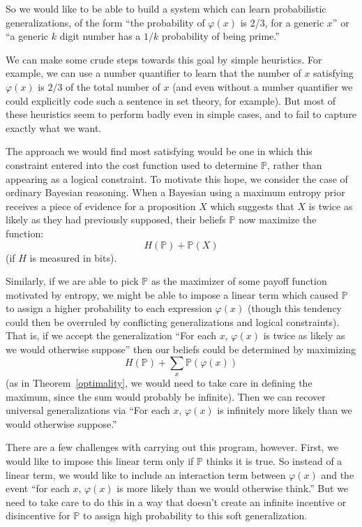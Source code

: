\documentclass[12pt]{article}
\theoremstyle{definition}
\newcommand{\of}[1]{\left(#1\right)}
\newcommand{\PP}{\mathbb{P}}
\renewcommand{\P}[1]{\mathbb{P}\of{#1}}
\newcommand{\vp}{\varphi}
\begin{document}
So we would like to be able to build a system which can learn
probabilistic generalizations, of the form ``the probability of $\vp\of{x}$
is 2/3, for a generic $x$'' or ``a generic $k$ digit number has a $1/k$ probability of being prime.''

We can make some crude steps towards this goal by simple heuristics.
For example, we can use a number quantifier to learn that the number of $x$
satisfying $\vp\of{x}$ is $2/3$ of the total number of $x$
(and even without a number quantifier we could explicitly code such a sentence in set theory, for example).
But most of these heuristics seem to perform badly even in simple cases,
and to fail to capture exactly what we want.


The approach we would find most satisfying would be one in which this constraint entered into the cost function
used to determine $\PP$, rather than appearing as a logical constraint.
To motivate this hope, we consider the case of ordinary Bayesian reasoning.
When a Bayesian using a maximum entropy prior receives a piece of evidence for a proposition $X$
which suggests that $X$ is twice as likely as they had previously supposed,
their beliefs $\PP$ now maximize the function:
\[ H\of{\PP} + \PP\of{X} \]
(if $H$ is measured in bits).

Similarly, if we are able to pick $\PP$ as the maximizer of some payoff function
motivated by entropy, we might be able to impose a linear term
which caused $\PP$ to assign a higher probability to each expression $\vp\of{x}$
(though this tendency could then be overruled by conflicting generalizations
and logical constraints).
That is, if we accept the generalization ``For each $x$, $\vp\of{x}$ is twice
as likely as we would otherwise suppose''
then our beliefs could be determined by maximizing
\[ H\of{\PP} + \sum_{x} \P{\vp\of{x}} \]
(as in Theorem~\ref{optimality}, we would need to take care
in defining the maximum, since the sum would probably be infinite).
Then we can recover universal generalizations via ``For each $x$, $\vp\of{x}$
is infinitely more likely than we would otherwise suppose.'' %

There are a few challenges with carrying out this program, however.
First, we would like to impose this linear term only if $\PP$
thinks it is true.
So instead of a linear term, we would like to include an interaction term
between $\vp\of{x}$ and the event ``for each $x$, $\vp\of{x}$ is more likely than we would
otherwise think.''
But we need to take care to do this in a way that doesn't create
an infinite incentive or disincentive for $\PP$ to assign high probability
to this soft generalization. %
\end{document}
